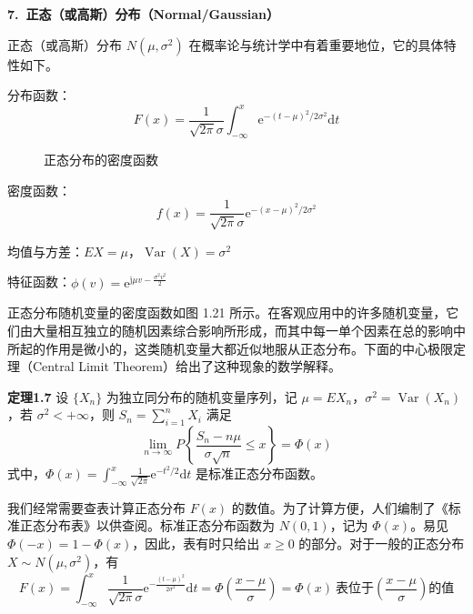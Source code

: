 \documentclass[11pt,openany,UTF8]{ctexbook}
\newcommand{\dif}{\mathrm{d}}                      %
\newcommand{\eu}{\mathrm{e}}                       %
\newcommand{\ju}{\mathrm{j}}                       %
\DeclareMathOperator{\Var}{Var}                    %
\newcommand{\bhead}[1]{\par\medskip\noindent\textbf{#1}\par\smallskip}
\newcommand{\thm}[1]{\par\medskip\noindent\textbf{#1}\quad}
\begin{document}
\bhead{7.\ 正态（或高斯\nobreak）分布（Normal/Gaussian\nobreak）}
\noindent
正态（或高斯\nobreak）分布 $N(\mu,\sigma^2)$ 在概率论与统计学中有着重要地位\nobreak，它的具体特性如下\nobreak。

分布函数\nobreak：
\[
F(x)=\frac{1}{\sqrt{2\pi}\sigma}\int_{-\infty}^{x}\eu^{-(t-\mu)^2/2\sigma^2}\dif t
\]

\begin{figure}
  \centering
  \caption{正态分布的密度函数}
  \label{fig:1.21}
\end{figure}

密度函数\nobreak：
\[
f(x)=\frac{1}{\sqrt{2\pi}\sigma}\eu^{-(x-\mu)^2/2\sigma^2}
\]

均值与方差\nobreak：\quad $EX=\mu$\nobreak，\quad $\Var(X)=\sigma^2$

特征函数\nobreak：\quad $\phi(v)=\eu^{\ju\mu v-\frac{\sigma^2v^2}{2}}$

正态分布随机变量的密度函数如图 1.21 所示\nobreak。在客观应用中的许多随机变量\nobreak，它们由大量相互独立的随机因素综合影响所形成\nobreak，而其中每一单个因素在总的影响中所起的作用是微小的\nobreak，这类随机变量大都近似地服从正态分布\nobreak。下面的中心极限定理（Central Limit Theorem\nobreak）给出了这种现象的数学解释\nobreak。

\thm{定理1.7}
设 $\{X_n\}$ 为独立同分布的随机变量序列\nobreak，记 $\mu=EX_n$\nobreak，$\sigma^2=\Var(X_n)$\nobreak，若 $\sigma^2<+\infty$\nobreak，则 $\displaystyle S_n=\sum_{i=1}^{n}X_i$ 满足
\begin{equation}
\lim_{n\to\infty}P\left\{\frac{S_n-n\mu}{\sigma\sqrt{n}}\leqslant x\right\}=\Phi(x)
\label{eq:1.69}
\end{equation}
式中\nobreak，$\displaystyle\Phi(x)=\int_{-\infty}^{x}\frac{1}{\sqrt{2\pi}}\eu^{-t^2/2}\dif t$ 是标准正态分布函数\nobreak。

我们经常需要查表计算正态分布 $F(x)$ 的数值\nobreak。为了计算方便\nobreak，人们编制了《标准正态分布表\nobreak》以供查阅\nobreak。标准正态分布函数为 $N(0,1)$\nobreak，记为 $\Phi(x)$\nobreak。易见 $\Phi(-x)=1-\Phi(x)$\nobreak，因此\nobreak，表有时只给出 $x\geqslant 0$ 的部分\nobreak。对于一般的正态分布 $X\sim N(\mu,\sigma^2)$\nobreak，有
\[
F(x)=\int_{-\infty}^{x}\frac{1}{\sqrt{2\pi}\sigma}\eu^{-\frac{(t-\mu)^2}{2\sigma^2}}\dif t=\Phi\left(\frac{x-\mu}{\sigma}\right)=\Phi(x)\ \text{表位于}\left(\frac{x-\mu}{\sigma}\right)\text{的值}
\]
\end{document}
